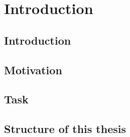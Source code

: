 \chapter{Introduction}
\label{ch:introduction}

\section{Introduction}
\section{Motivation}
\section{Task}
\section{Structure of this thesis}